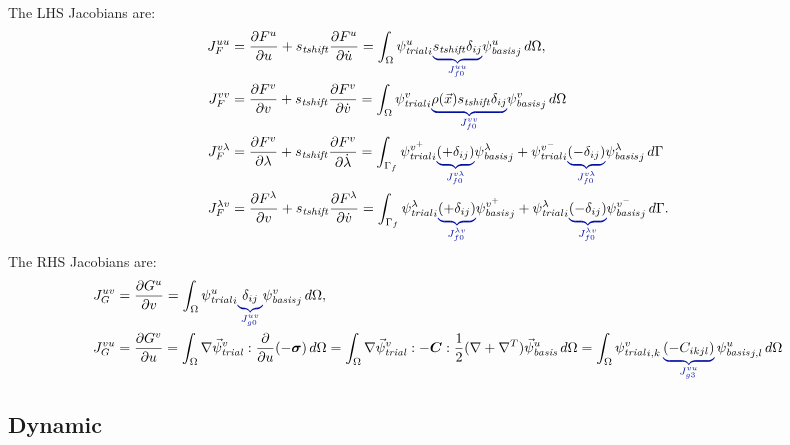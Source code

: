 The LHS Jacobians are:
\begin{align}
  J_F^{uu} &= \frac{\partial F^u}{\partial u} + s_\mathit{tshift} \frac{\partial F^u}{\partial \dot{u}} =
             \int_\Omega \trialscalar[u]_i \eqnannotate{s_\mathit{tshift} \delta_{ij}}{J^{uu}_{f0}} \basisscalar[u]_j  \, d\Omega, \\
  J_F^{vv} &= \frac{\partial F^v}{\partial v} + s_\mathit{tshift} \frac{\partial F^v}{\partial \dot{v}} =
             \int_\Omega \trialscalar[v]_i \eqnannotate{\rho(\vec{x}) s_\mathit{tshift} \delta_{ij}}{J ^{vv}_{f0}} \basisscalar[v]_j \, d\Omega \\
  J_F^{v\lambda} &= \frac{\partial F^v}{\partial \lambda} + s_\mathit{tshift} \frac{\partial F^v}{\partial \dot{\lambda}} =
                    \int_{\Gamma_{f}} \trialscalar[v^+]_i \eqnannotate{\left(+\delta_{ij}\right)}{J^{v\lambda}_{f0}} \basisscalar[\lambda]_j
                   + \trialscalar[v^-]_i \eqnannotate{\left(-\delta_{ij}\right)}{J^{v\lambda}_{f0}} \basisscalar[\lambda]_j\, d\Gamma \\
  J_F^{\lambda v} &= \frac{\partial F^\lambda}{\partial v} + s_\mathit{tshift} \frac{\partial F^\lambda}{\partial \dot{v}} =
                    \int_{\Gamma_{f}} \trialscalar[\lambda]_i 
                    \eqnannotate{\left(+\delta_{ij}\right)}{J^{\lambda v}_{f0}} \basisscalar[v^+]_j
                    + \trialscalar[\lambda]_i \eqnannotate{\left(-\delta_{ij}\right)}{J^{\lambda v}_{f0}} \basisscalar[v^-]_j \, d\Gamma.
\end{align}
The RHS Jacobians are:
\begin{align}
  J_G^{uv} &= \frac{\partial G^u}{\partial v} =
            \int_\Omega \trialscalar[u]_i \eqnannotate{\delta_{ij}}{J^{uv}_{g0}} \basisscalar[v]_j \, d\Omega , \\
  J_G^{vu} &= \frac{\partial G^v}{\partial u} = \int_\Omega \nabla \trialvec[v] : 
\frac{\partial}{\partial u}(-\tensor{\sigma}) \, d\Omega 
  = \int_\Omega \nabla \trialvec[v] : -\tensor{C} : \frac{1}{2}(\nabla + \nabla^T)\basisvec[u] 
\, d\Omega 
  = \int_\Omega \trialscalar[v]_{i,k} \, \eqnannotate{\left( -C_{ikjl} \right)}{J_{g3}^{vu}} \, \basisscalar[u]_{j,l}\, d\Omega
\end{align}


\subsection{Dynamic}

